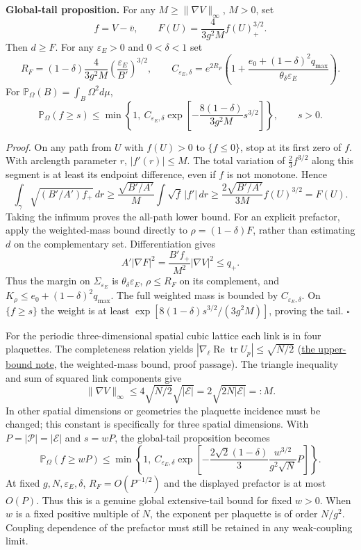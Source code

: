 \documentclass[11pt,a4paper]{article}
\begin{document}
\textbf{Global-tail proposition.} For any \(M\ge\|\nabla V\|_\infty\),
\(M>0\), set \[f=V-\bar v,\qquad F(U)=\frac{4}{3g^2M}f(U)_+^{3/2}.\]
Then \(d\ge F\). For any \(\varepsilon_E>0\) and \(0<\delta<1\) set
\[R_F=(1-\delta)\frac{4}{3g^2M}
\left(\frac{\varepsilon_E}{B'}\right)^{3/2},\qquad
C_{\varepsilon_E,\delta}=e^{2R_F}
\left(1+\frac{e_0+(1-\delta)^2q_{\max}}
{\theta_\delta\varepsilon_E}\right).\] For
\(\mathbb P_\Omega(B)=\int_B\Omega^2d\mu\), \[\mathbb P_\Omega(f\ge s)
\le\min\left\{1,\ C_{\varepsilon_E,\delta}
\exp\left[-\frac{8(1-\delta)}{3g^2M}s^{3/2}\right]\right\},
\qquad s>0.\]

\emph{Proof.} On any path from \(U\) with \(f(U)>0\) to \(\{f\le0\}\),
stop at its first zero of \(f\). With arclength parameter \(r\),
\(|f'(r)|\le M\). The total variation of \(\frac23 f^{3/2}\) along this
segment is at least its endpoint difference, even if \(f\) is not
monotone. Hence \[\int_\gamma\sqrt{(B'/A')f_+}\,dr
\ge\frac{\sqrt{B'/A'}}{M}\int\sqrt f\,|f'|\,dr
\ge\frac{2\sqrt{B'/A'}}{3M}f(U)^{3/2}=F(U).\] Taking the infimum proves
the all-path lower bound. For an explicit prefactor, apply the
weighted-mass bound directly to \(\rho=(1-\delta)F\), rather than
estimating \(d\) on the complementary set. Differentiation gives
\[A'|\nabla F|^2
=\frac{B'f_+}{M^2}|\nabla V|^2\le q_+.\] Thus the margin on
\(\Sigma_{\varepsilon_E}\) is \(\theta_\delta\varepsilon_E\),
\(\rho\le R_F\) on its complement, and
\(K_\rho\le e_0+(1-\delta)^2q_{\max}\). The full weighted mass is
bounded by \(C_{\varepsilon_E,\delta}\). On \(\{f\ge s\}\) the weight is
at least \(\exp[8(1-\delta)s^{3/2}/(3g^2M)]\), proving the tail.
\(\square\)

For the periodic three-dimensional spatial cubic lattice each link is in
four plaquettes. The completeness relation yields
\(|\nabla_\ell\operatorname{Re}\operatorname{tr}U_p|\le\sqrt{N/2}\)
(\href{lattice-gap-upper-bounds.md}{the upper-bound note}, the
weighted-mass bound, proof passage). The triangle inequality and sum of
squared link components give
\[\|\nabla V\|_\infty\le4\sqrt{N/2}\sqrt{|\mathcal E|}
=2\sqrt{2N|\mathcal E|}=:M.\] In other spatial dimensions or geometries
the plaquette incidence must be changed; this constant is specifically
for three spatial dimensions. With \(P=|\mathcal P|=|\mathcal E|\) and
\(s=wP\), the global-tail proposition becomes
\[\mathbb P_\Omega(f\ge wP)
\le\min\left\{1,\ C_{\varepsilon_E,\delta}
\exp\left[-\frac{2\sqrt2(1-\delta)}{3}
\frac{w^{3/2}}{g^2\sqrt N}P\right]\right\}.\] At fixed
\(g,N,\varepsilon_E,\delta\), \(R_F=O(P^{-1/2})\) and the displayed
prefactor is at most \(O(P)\). Thus this is a genuine global
extensive-tail bound for fixed \(w>0\). When \(w\) is a fixed positive
multiple of \(N\), the exponent per plaquette is of order \(N/g^2\).
Coupling dependence of the prefactor must still be retained in any
weak-coupling limit.
\end{document}
